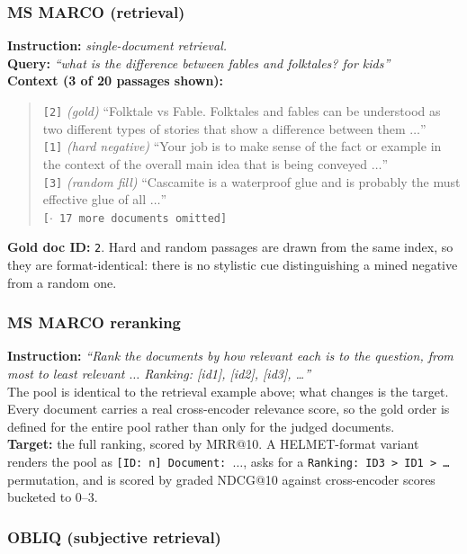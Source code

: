\subsubsection{MS MARCO (retrieval)}

\textbf{Instruction:} \emph{single-document retrieval.}\\
\textbf{Query:} \emph{``what is the difference between fables and folktales? for kids''}\\
\textbf{Context (3 of 20 passages shown):}
\begin{quote}\small
\texttt{[2]} \emph{(gold)} ``Folktale vs Fable. Folktales and fables can be understood as two
different types of stories that show a difference between them $\dots$''\\
\texttt{[1]} \emph{(hard negative)} ``Your job is to make sense of the fact or example in the context
of the overall main idea that is being conveyed $\dots$''\\
\texttt{[3]} \emph{(random fill)} ``Cascamite is a waterproof glue and is probably the must effective
glue of all $\dots$''\\
\texttt{[$\cdot$ 17 more documents omitted]}
\end{quote}
\textbf{Gold doc ID:} \texttt{2}. Hard and random passages are drawn from the same index, so they are
format-identical: there is no stylistic cue distinguishing a mined negative from a random one.

\subsubsection{MS MARCO reranking}

\textbf{Instruction:} \emph{``Rank the documents by how relevant each is to the question, from most to
least relevant $\dots$ Ranking: [id1], [id2], [id3], \dots''}\\
The pool is identical to the retrieval example above; what changes is the target. Every document
carries a real cross-encoder relevance score, so the gold order is defined for the entire pool
rather than only for the judged documents.\\
\textbf{Target:} the full ranking, scored by MRR@10. A HELMET-format variant renders the pool as
\texttt{[ID: n] Document: $\dots$}, asks for a \texttt{Ranking: ID3 > ID1 > \dots} permutation, and
is scored by graded NDCG@10 against cross-encoder scores bucketed to 0--3.

\subsubsection{OBLIQ (subjective retrieval)}

